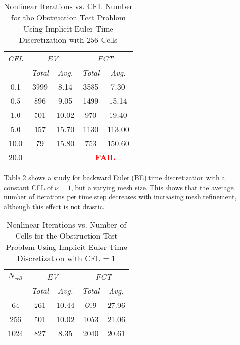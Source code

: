 \begin{table}[htb]\caption{Nonlinear Iterations vs. CFL Number for the
  Obstruction Test Problem Using Implicit Euler Time Discretization with 256 Cells}
\label{tab:obstruction_be_iterations_cfl}
\centering
\begin{tabular}{c c c c c}\toprule
\emph{CFL} & \multicolumn{2}{c}{\emph{EV}} & \multicolumn{2}{c}{\emph{FCT}}\\
           & \emph{Total} & \emph{Avg.}    &  \emph{Total} & \emph{Avg.}\\\midrule
0.1  & 3999 &  8.14 & 3585 &   7.30\\
0.5  &  896 &  9.05 & 1499 &  15.14\\
1.0  &  501 & 10.02 &  970 &  19.40\\
5.0  &  157 & 15.70 & 1130 & 113.00\\
10.0 &   79 & 15.80 &  753 & 150.60\\
20.0 &   -- &    -- & \multicolumn{2}{c}{\textcolor{red}{\textbf{FAIL}}}\\
\bottomrule\end{tabular}
\end{table}

Table \ref{tab:obstruction_be_iterations_mesh} shows a study for backward
Euler (BE) time discretization with a
constant CFL of $\nu=1$, but a varying mesh size. This shows that the average
number of iterations per time step decreases with increasing mesh refinement,
although this effect is not drastic.

\begin{table}[htb]\caption{Nonlinear Iterations vs. Number of Cells for the
  Obstruction Test Problem Using Implicit Euler Time Discretization with CFL = 1}
\label{tab:obstruction_be_iterations_mesh}
\centering
\begin{tabular}{c c c c c}\toprule
$N_{cell}$ & \multicolumn{2}{c}{\emph{EV}} & \multicolumn{2}{c}{\emph{FCT}}\\
           & \emph{Total} & \emph{Avg.} &  \emph{Total} & \emph{Avg.}\\\midrule
64         & 261 & 10.44 &  699 & 27.96\\
256        & 501 & 10.02 & 1053 & 21.06\\
1024       & 827 &  8.35 & 2040 & 20.61\\
\bottomrule\end{tabular}
\end{table}

